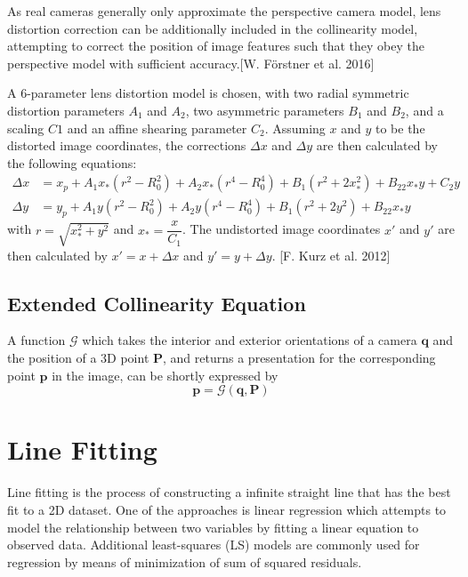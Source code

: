 As real cameras generally only approximate the perspective camera model, lens distortion correction can be additionally included in the collinearity model, attempting to correct the position of image features such that they obey the perspective model with sufficient accuracy.[W. Förstner et al. 2016] 

A 6-parameter lens distortion model is chosen, with two radial symmetric distortion parameters $A_1$ and $A_2$, two asymmetric parameters $B_1$ and $B_2$, and a scaling $C1$ and an affine shearing parameter $C_2$. Assuming $x$ and $y$ to be the distorted image coordinates, the corrections $\Delta x$ and $\Delta y$ are then calculated by the following equations:
\begin{equation} \label{eq:LensDistortion}
\begin{split}
\Delta x &= x_p + A_1x_*(r^2-R_0^2) + A_2x_*(r^4-R_0^4) + B_1(r^2+2x_*^2) + B_22x_*y+C_2y \\
\Delta y &= y_p + A_1y  (r^2-R_0^2) + A_2y  (r^4-R_0^4) + B_1(r^2+2y^2)   + B_22x_*y
\end{split}
\end{equation}
with $r=\sqrt{x_*^2+y^2}$ and $x_*=\dfrac{x}{C_1}$. The undistorted image coordinates $x\prime$ and $y\prime$ are then calculated by $x\prime=x+\Delta x$ and $y\prime=y+\Delta y$. [F. Kurz et al. 2012] 

\subsection{Extended Collinearity Equation}
\label{subsec:ExtendedCollinearity}
A function $\mathcal{G}$ which takes the interior and exterior orientations of a camera $\mathbf{q}$ and the position of a 3D point $\mathbf{P}$, and returns a presentation for the corresponding point $\mathbf{p}$ in the image, can be shortly expressed by
\begin{equation} \label{eq:Gfunction}
\mathbf{p} = \mathcal{G}(\mathbf{q},\mathbf{P}) 
\end{equation}

\section{Line Fitting}
\label{sec:LineFitting}

Line fitting is the process of constructing a infinite straight line that has the best fit to a 2D dataset. One of the approaches is linear regression which attempts to model the relationship between two variables by fitting a linear equation to observed data. %
Additional least-squares (LS) models are commonly used for regression by means of minimization of sum of squared residuals.

